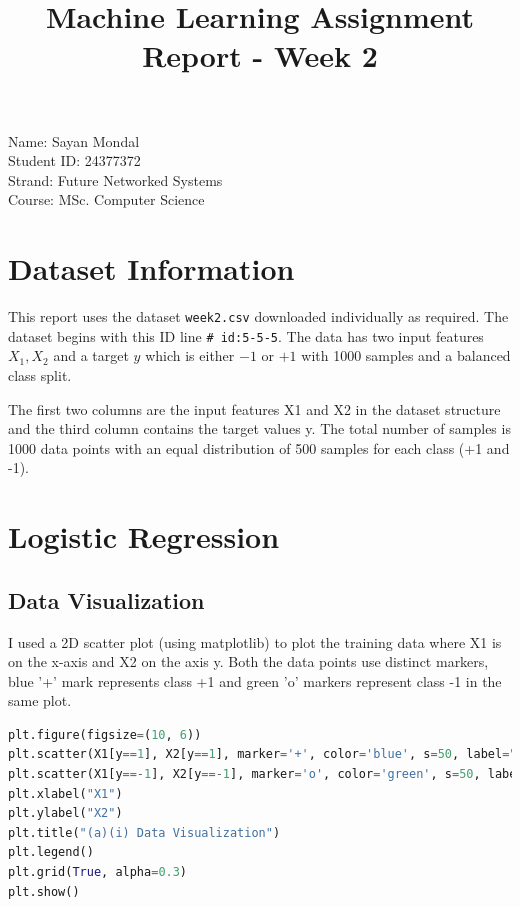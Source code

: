 \documentclass[12pt,a4paper]{article}
\title{\textbf{Machine Learning Assignment Report - Week 2}}
\author{}
\date{}
\begin{document}
\maketitle

\begin{center}
Name: Sayan Mondal\\
Student ID: 24377372\\
Strand: Future Networked Systems\\
Course: MSc. Computer Science
\end{center}

\vspace{1em}

\section*{Dataset Information}

This report uses the dataset \texttt{week2.csv} downloaded individually as required. The dataset begins with this ID line \texttt{\# id:5-5-5}.  The data has two input features \( X_1, X_2 \) and a target \( y \) which is either $-1$ or $+1$ with 1000 samples and a balanced class split.

The first two columns are the input features X1 and X2 in the dataset structure and the third column contains the target values y. The total number of samples is 1000 data points with an equal distribution of 500 samples for each class (+1 and -1).

\section{Logistic Regression}

\subsection{Data Visualization}

I used a 2D scatter plot (using matplotlib) to plot the training data where X1 is on the x-axis and X2 on the axis y. Both the data points use distinct markers, blue '+' mark represents class +1 and green 'o' markers represent class -1 in the same plot.

\begin{lstlisting}[language=Python, caption={Data Visualization}]
plt.figure(figsize=(10, 6))
plt.scatter(X1[y==1], X2[y==1], marker='+', color='blue', s=50, label="Class +1")
plt.scatter(X1[y==-1], X2[y==-1], marker='o', color='green', s=50, label="Class -1")
plt.xlabel("X1")
plt.ylabel("X2")
plt.title("(a)(i) Data Visualization")
plt.legend()
plt.grid(True, alpha=0.3)
plt.show()
\end{lstlisting}
\end{document}
